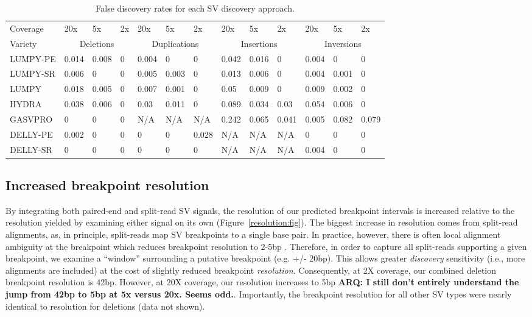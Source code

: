 \documentclass[11pt]{article}
\begin{document}
\begin{table}[h!b!p!]
\small
\caption{False discovery rates for each SV discovery approach.}
\begin{tabular}{l|lll|lll|lll|lll}
		Coverage
		&20x&5x&2x &20x&5x&2x &20x&5x&2x &20x&5x&2x \\
\cline{1-13}
			Variety
			&\multicolumn{3}{c}{Deletions} 
			&\multicolumn{3}{|c}{Duplications} 
			&\multicolumn{3}{|c}{Insertions}
			&\multicolumn{3}{|c}{Inversions} \\
\cline{1-13}
LUMPY-PE		&0.014&0.008&0&0.004&0	  &0    &0.042&0.016&0	  &0.004&0	  &0 \\
LUMPY-SR      &0.006&0	&0&0.005&0.003&0	&0.013&0.006&0	  &0.004&0.001&0 \\
LUMPY    &0.018&0.005&0&0.007&0.001&0	&0.05 &0.009&0	  &0.009&0.002&0 \\
HYDRA   &0.038&0.006&0&0.03 &0.011&0	&0.089&0.034&0.03 &0.054&0.006&0 \\
GASVPRO	&0	  &0	&0&N/A  &N/A  &N/A  &0.242&0.065&0.041&0.005&0.082&0.079 \\
DELLY-PE	&0.002&0	&0&0	&0	  &0.028&N/A  &N/A	&N/A  &0	&0	  &0 \\
DELLY-SR	&0	  &0	&0&0	&0	  &0	&N/A  &N/A	&N/A  &0.004&0	  &0 \\ 

\end{tabular}
\label{table:fdr}
\end{table}


\subsection{Increased breakpoint resolution}
By integrating both paired-end and split-read SV signals, the resolution of
our predicted breakpoint intervals is increased relative to the resolution 
yielded by examining either signal on its own (Figure~\ref{resolution:fig}). The biggest increase
in resolution comes from split-read alignments, as, in principle, split-reads
map SV breakpoints to a single base pair. In practice, however, there is
often local alignment ambiguity at the breakpoint which reduces breakpoint 
resolution to 2-5bp \cite{quinlan2010b}. Therefore, in order to capture all
split-reads supporting a given breakpoint, we examine a ``window'' surrounding
a putative breakpoint (e.g. +/- 20bp). This allows greater \emph{discovery}
sensitivity (i.e., more alignments are included) at the cost of slightly reduced
breakpoint \emph{resolution}. Consequently, at 2X coverage, our combined
deletion breakpoint resolution is 42bp. However, at 20X coverage, our resolution
increases to 5bp \textbf{ARQ: I still don't entirely understand the jump from
42bp to 5bp at 5x versus 20x.  Seems odd.}. Importantly, the breakpoint 
resolution for all other SV types were nearly identical to resolution for 
deletions (data not shown).
\end{document}
